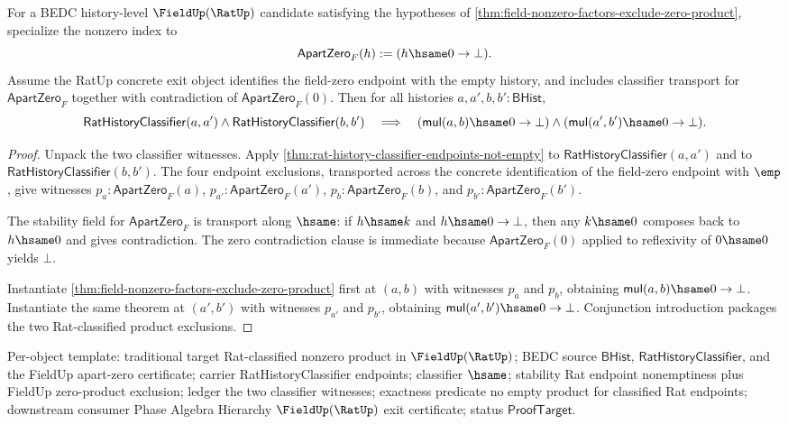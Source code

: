 \begin{theorem}
\label{thm:ratup-fieldup-rat-classified-factors-exclude-empty-product}
For a BEDC history-level $\FieldUp(\RatUp)$ candidate satisfying the hypotheses
of \autoref{thm:field-nonzero-factors-exclude-zero-product}, specialize the
nonzero index to
$$
\mathsf{ApartZero}_F(h):=(h\hsame0\to\bot).
$$
Assume the RatUp concrete exit object identifies the field-zero endpoint with
the empty history, and includes classifier transport for
$\mathsf{ApartZero}_F$ together with contradiction of
$\mathsf{ApartZero}_F(0)$. Then for all histories
$a,a',b,b':\mathsf{BHist}$,
$$
\mathsf{RatHistoryClassifier}(a,a')
\land
\mathsf{RatHistoryClassifier}(b,b')
\quad\Longrightarrow\quad
(\mathsf{mul}(a,b)\hsame0\to\bot)
\land
(\mathsf{mul}(a',b')\hsame0\to\bot).
$$
\end{theorem}
\begin{proof}
Unpack the two classifier witnesses. Apply
\autoref{thm:rat-history-classifier-endpoints-not-empty} to
$\mathsf{RatHistoryClassifier}(a,a')$ and to
$\mathsf{RatHistoryClassifier}(b,b')$. The four endpoint exclusions, transported
across the concrete identification of the field-zero endpoint with $\emp$,
give witnesses
$p_a:\mathsf{ApartZero}_F(a)$, $p_{a'}:\mathsf{ApartZero}_F(a')$,
$p_b:\mathsf{ApartZero}_F(b)$, and $p_{b'}:\mathsf{ApartZero}_F(b')$.

The stability field for $\mathsf{ApartZero}_F$ is transport along $\hsame$:
if $h\hsame k$ and $h\hsame0\to\bot$, then any $k\hsame0$ composes back to
$h\hsame0$ and gives contradiction. The zero contradiction clause is immediate
because $\mathsf{ApartZero}_F(0)$ applied to reflexivity of $0\hsame0$ yields
$\bot$.

Instantiate \autoref{thm:field-nonzero-factors-exclude-zero-product} first at
$(a,b)$ with witnesses $p_a$ and $p_b$, obtaining
$\mathsf{mul}(a,b)\hsame0\to\bot$. Instantiate the same theorem at
$(a',b')$ with witnesses $p_{a'}$ and $p_{b'}$, obtaining
$\mathsf{mul}(a',b')\hsame0\to\bot$. Conjunction introduction packages the two
Rat-classified product exclusions.
\end{proof}

Per-object template: traditional target Rat-classified nonzero product in
$\FieldUp(\RatUp)$; BEDC source $\mathsf{BHist}$,
$\mathsf{RatHistoryClassifier}$, and the FieldUp apart-zero certificate;
carrier RatHistoryClassifier endpoints; classifier $\hsame$; stability Rat
endpoint nonemptiness plus FieldUp zero-product exclusion; ledger the two
classifier witnesses; exactness predicate no empty product for classified Rat
endpoints; downstream consumer Phase Algebra Hierarchy $\FieldUp(\RatUp)$ exit
certificate; status $\mathsf{ProofTarget}$.

